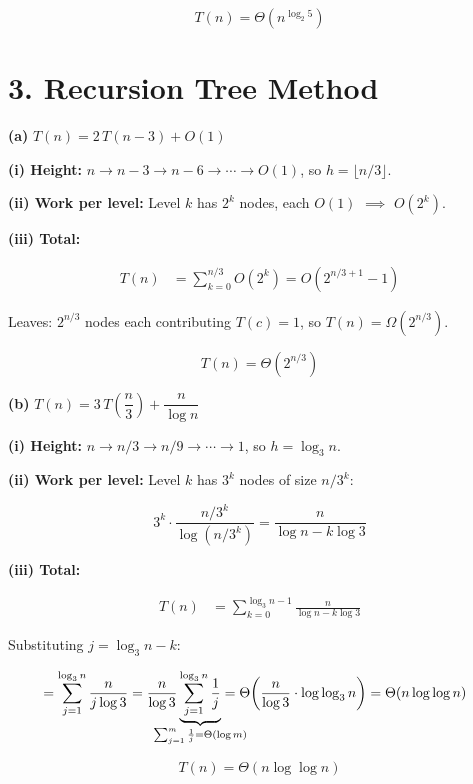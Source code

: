 \documentclass[11pt]{article}
\begin{document}
\[
\boxed{T(n) = \Theta\!\left(n^{\log_2 5}\right)}
\]


\section*{3. Recursion Tree Method}

\textbf{(a)} $T(n) = 2\,T(n-3) + O(1)$

\textbf{(i) Height:} $n \to n{-}3 \to n{-}6 \to \cdots \to O(1)$, so $h = \lfloor n/3 \rfloor$.

\textbf{(ii) Work per level:} Level $k$ has $2^k$ nodes, each $O(1)$ $\implies$ $O(2^k)$.

\textbf{(iii) Total:}

\begin{align*}
T(n) &= \sum_{k=0}^{n/3} O(2^k) = O\!\left(2^{n/3+1} - 1\right)
\end{align*}

Leaves: $2^{n/3}$ nodes each contributing $T(c) = 1$, so $T(n) = \Omega(2^{n/3})$.

\[
\boxed{T(n) = \Theta\!\left(2^{n/3}\right)}
\]


\textbf{(b)} $T(n) = 3\,T\!\left(\dfrac{n}{3}\right) + \dfrac{n}{\log n}$

\textbf{(i) Height:} $n \to n/3 \to n/9 \to \cdots \to 1$, so $h = \log_3 n$.

\textbf{(ii) Work per level:} Level $k$ has $3^k$ nodes of size $n/3^k$:

\[
3^k \cdot \frac{n/3^k}{\log(n/3^k)} = \frac{n}{\log n - k\log 3}
\]

\textbf{(iii) Total:}

\begin{align*}
T(n) &= \sum_{k=0}^{\log_3 n - 1} \frac{n}{\log n - k\log 3}
\end{align*}

Substituting $j = \log_3 n - k$:

\begin{align*}
&= \sum_{j=1}^{\log_3 n} \frac{n}{j\log 3}
= \frac{n}{\log 3}\underbrace{\sum_{j=1}^{\log_3 n}\frac{1}{j}}_{\mathclap{\sum_{j=1}^{m}\frac{1}{j} = \Theta(\log m)}}
= \Theta\!\left(\frac{n}{\log 3}\cdot \log\log_3 n\right)
= \Theta(n\log\log n)
\end{align*}

\[
\boxed{T(n) = \Theta(n\log\log n)}
\]
\end{document}
